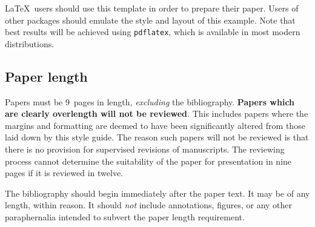 \documentclass{bmvc2k}
\begin{document}
\LaTeX\ users should use this template in order to prepare their paper.
Users of other packages should emulate the style and layout of this
example.  Note that best results will be achieved using {\tt pdflatex},
which is available in most modern distributions.

\subsection{Paper length}
Papers must be 9~pages in length, {\em excluding} the bibliography.
{\bf Papers which are
clearly overlength will not be reviewed}.  This includes papers where the
margins and formatting are deemed to have been significantly altered from
those laid down by this style guide.  The reason such papers will not be
reviewed is that there is no provision for supervised revisions of
manuscripts.  The reviewing process cannot determine the suitability of the
paper for presentation in nine pages if it is reviewed in twelve.

The bibliography should begin immediately after the paper text.  It may
be of any length, within reason.  It should {\em not} include
annotations, figures, or any other paraphernalia intended to subvert the
paper length requirement.
\end{document}
